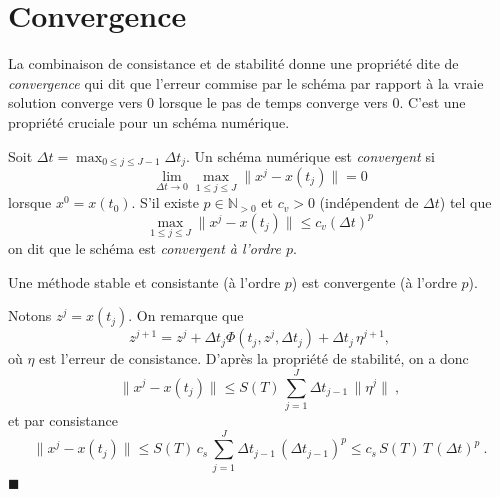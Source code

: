 \hypertarget{ed2-convergence}{%
\section{Convergence}\label{ed2-convergence}}

La combinaison de consistance et de stabilité donne une propriété dite
de \emph{convergence} qui dit que l'erreur commise par le schéma par
rapport à la vraie solution converge vers 0 lorsque le pas de temps
converge vers 0. C'est une propriété cruciale pour un schéma numérique.

\hypertarget{ed2-def_conv}{}
\begin{definition}[Convergence]\label{ed2-def_conv}
Soit \({\Delta t}= \max_{0 \leq j \leq J-1} {\Delta t}_j\). Un schéma
numérique est \emph{convergent} si \[
\lim_{{\Delta t}\to 0} \max_{1 \leq j \leq J} \|x^j - x(t_j)\| = 0
\] lorsque \(x^0 = x(t_0)\). S'il existe \(p\in \mathbb{N}_{>0}\) et
\(c_v>0\) (indépendent de \({\Delta t}\)) tel que \[
\max_{1 \leq j \leq J} \|x^j - x(t_j)\| \leq c_v ({\Delta t})^{p}
\] on dit que le schéma est \emph{convergent à l'ordre \(p\)}.
\end{definition}

\hypertarget{ed2-theo_Lax}{}
\begin{theoreme}\label{ed2-theo_Lax}
Une méthode stable et consistante (à l'ordre \(p\)) est convergente (à
l'ordre \(p\)).
\end{theoreme}

\hypertarget{ed2-duxe9monstration-3}{}
\begin{preuve}\label{ed2-duxe9monstration-3}
Notons \(z^j=x(t_j)\). On remarque que \[
z^{j+1}  = z^j + {\Delta t}_j \Phi(t_j,z^j,{\Delta t}_j) + {\Delta t}_j\, \eta^{j+1},
\] où \(\eta\) est l'erreur de consistance. D'après la propriété de
stabilité, on a donc \[
\|x^j - x(t_j)\| \leq S(T) \,  \sum_{j = 1}^J {\Delta t}_{j-1}\, \|\eta^j\| \ ,
\] et par consistance \[
\|x^j - x(t_j)\| \leq S(T) \,  c_s \,  \sum_{j = 1}^J {\Delta t}_{j-1}\, ({\Delta t}_{j-1})^{p} \leq  c_s \, S(T) \, T \, ({\Delta t})^{p}  \ . 
\]\hfill$\blacksquare$
\end{preuve}

